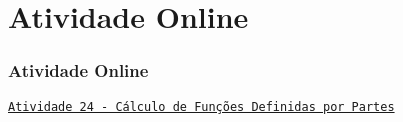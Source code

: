 \section{Atividade Online}
\begin{frame}
\frametitle{Atividade Online} 

\href{https://pt.khanacademy.org/math/algebra-home/alg-functions/alg-piecewise-functions/e/evaluating-piecewise-functions}
{{\tt Atividade 24 - Cálculo de Funções Definidas por Partes}}



\end{frame}